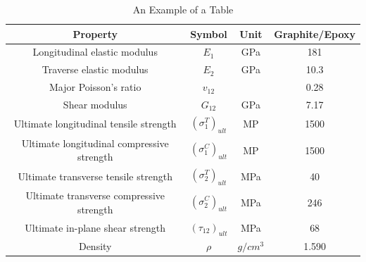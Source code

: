 \begin{table}
\caption{An Example of a Table}
\label{T300/5308 material properties}
\centering
\begin{tabular}{cccc}
	\toprule
	Property								   & Symbol				  & Unit  &  Graphite/Epoxy     \\
	\midrule
	Longitudinal elastic modulus			   & $E_1$				  & GPa   &  181                 \\
	Traverse elastic modulus				   & $E_2$				  & GPa   &  10.3                \\
	Major Poisson's ratio					   & $v_{12}$			  &       &  0.28                \\
	Shear modulus							   & $G_{12}$			  & GPa   &  7.17                \\
	Ultimate longitudinal tensile strength     & $(\sigma_1^T)_{ult}$ & MP    &  1500                 \\
	Ultimate longitudinal compressive strength & $(\sigma_1^C)_{ult}$ & MP    &  1500                 \\
	Ultimate transverse tensile strength       & $(\sigma_2^T)_{ult}$ & MPa   &  40                   \\
	Ultimate transverse compressive strength   & $(\sigma_2^C)_{ult}$ & MPa   &  246                   \\
	Ultimate in-plane shear strength           & $(\tau_{12})_{ult}$  & MPa   &  68                    \\
	Density                                    & $\rho$               & $g/cm^3$ &  1.590                    \\
	\bottomrule
\end{tabular}
\end{table}





